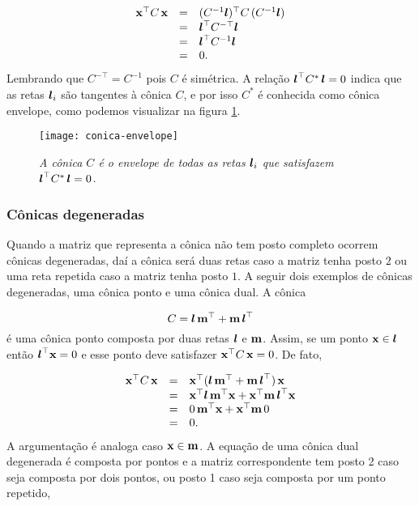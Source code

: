 \begin{equation*}
\begin{array}{rcl}
\mathbf{x}^\top C\,\mathbf{x}&=&(C^{-1}\boldsymbol{l})^\top C\,(
C^{-1}\boldsymbol{l})\\
&=&\boldsymbol{l}^\top C^{-\top}\boldsymbol{l}\\
&=&\boldsymbol{l}^\top C^{-1}\boldsymbol{l}\\
&=&0.
\end{array}
\end{equation*}
Lembrando que $C^{-\top}=C^{-1}$ pois $C$ é simétrica. A relação $\boldsymbol{l}^\top C^*\,\boldsymbol{l}=0$ indica que as retas $\boldsymbol{l}_i$ são tangentes à cônica $C$, e por isso $C^*$ é conhecida como cônica envelope, como podemos visualizar na figura \ref{fig.conica-envelope}.

\begin{figure}[!htb]
\centering
\texttt{[image: conica-envelope]}
\caption{\textit{A cônica $C$ é o envelope de todas as retas $\boldsymbol{l}_i$ que satisfazem $\boldsymbol{l}^\top C^*\,\boldsymbol{l}=0$.}}
\label{fig.conica-envelope}
\end{figure}

\subsubsection{Cônicas degeneradas}\label{sec.conicas-degeneradas}

Quando a matriz que representa a cônica não tem posto completo ocorrem cônicas degeneradas, daí a cônica será duas retas caso a matriz tenha posto $2$ ou uma reta repetida caso a matriz tenha posto $1$. A seguir dois exemplos de cônicas degeneradas, uma cônica ponto e uma cônica dual. A cônica 

\begin{equation*}
C=\boldsymbol{l}\,{\bf m}^\top+{\bf m}\,\boldsymbol{l}^\top
\end{equation*}
é uma cônica ponto composta por duas retas $\boldsymbol{l}$ e ${\bf m}$. Assim, se um ponto $\mathbf{x}\in\boldsymbol{l}$ então $\boldsymbol{l}^\top\mathbf{x}=0$ e esse ponto deve satisfazer $\mathbf{x}^\top C\,\mathbf{x}=0$. De fato,

\begin{equation*}
\begin{array}{rcl}
\mathbf{x}^\top C\,\mathbf{x}&=&\mathbf{x}^\top(\boldsymbol{l}\,{\bf m}^\top+{\bf m}\,\boldsymbol{l}^\top)\,\mathbf{x}\\
&=&\mathbf{x}^\top\boldsymbol{l}\,{\bf m}^\top\mathbf{x}+\mathbf{x}^\top {\bf m}\,\boldsymbol{l}^\top\mathbf{x}\\
&=&0\,{\bf m}^\top\mathbf{x}+\mathbf{x}^\top{\bf m}\,0\\
&=&0.
\end{array}
\end{equation*}
A argumentação é analoga caso $\mathbf{x}\in{\bf m}$. A equação de uma cônica dual degenerada é composta por pontos e a matriz correspondente tem posto 2 caso seja composta por dois pontos, ou posto 1 caso seja composta por um ponto repetido, 

